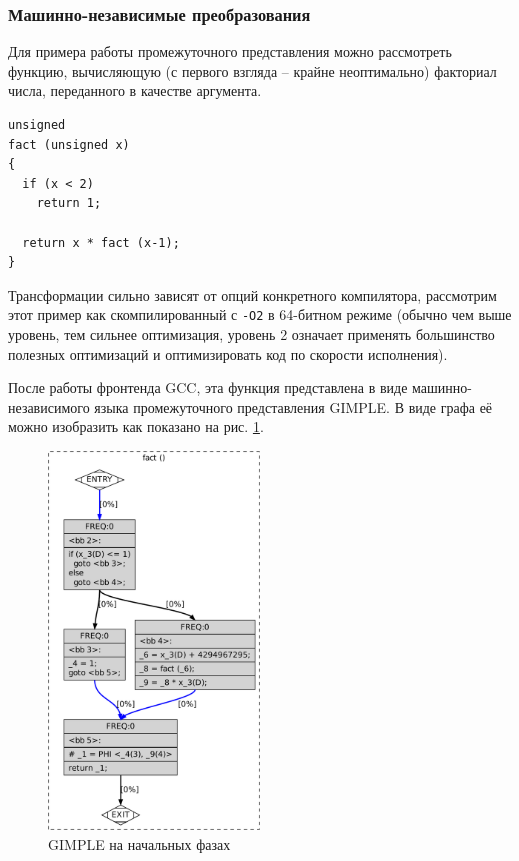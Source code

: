 \documentclass[a4paper,12pt,oneside]{article}
\begin{document}
\subsubsection{Машинно-независимые преобразования}

Для примера работы промежуточного представления можно рассмотреть функцию, вычисляющую (с первого взгляда -- крайне неоптимально) факториал числа, переданного в качестве аргумента.

\begin{lstlisting}
unsigned
fact (unsigned x)
{
  if (x < 2)
    return 1;

  return x * fact (x-1);
}
\end{lstlisting}

Трансформации сильно зависят от опций конкретного компилятора, рассмотрим этот пример как скомпилированный с \lstinline!-O2! в 64-битном режиме (обычно чем выше уровень, тем сильнее оптимизация, уровень 2 означает применять большинство полезных оптимизаций и оптимизировать код по скорости исполнения).

После работы фронтенда GCC, эта функция представлена в виде машинно-независимого языка промежуточного представления GIMPLE. В виде графа её можно изобразить как показано на рис. \ref{fig:fact_gimple_ssa}.

\begin{figure}[ht]
\centering
\includegraphics[width=0.5\textwidth]{illustrations/fact-ssa-crop.pdf}
\caption{GIMPLE на начальных фазах}
\label{fig:fact_gimple_ssa}
\end{figure}
\end{document}
